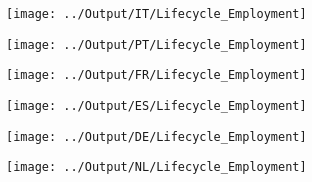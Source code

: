 \documentclass[12pt,notitlepage]{article}
\begin{document}
\begin{figure}[!htpb]
\centering
\caption{Average Employment by Year (Orbis)}
\begin{subfigure}{.49\textwidth}
    \centering
 \texttt{[image: ../Output/IT/Lifecycle\_Employment]}
\end{subfigure}%
\begin{subfigure}{.49\textwidth}
    \centering
 \texttt{[image: ../Output/PT/Lifecycle\_Employment]}
\end{subfigure}
\begin{subfigure}{.49\textwidth}
    \centering
 \texttt{[image: ../Output/FR/Lifecycle\_Employment]}
\end{subfigure}%
\begin{subfigure}{.49\textwidth}
    \centering
 \texttt{[image: ../Output/ES/Lifecycle\_Employment]}
\end{subfigure}
\begin{subfigure}{.49\textwidth}
    \centering
 \texttt{[image: ../Output/DE/Lifecycle\_Employment]}
\end{subfigure}
\begin{subfigure}{.49\textwidth}
    \centering
 \texttt{[image: ../Output/NL/Lifecycle\_Employment]}
\end{subfigure}
\end{figure}
\pagebreak

\end{document}
